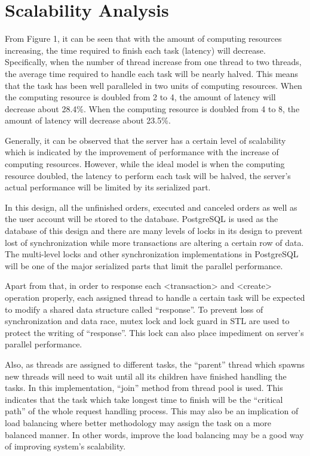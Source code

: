 \documentclass{article}
\begin{document}
\section{Scalability Analysis}
From Figure 1, it can be seen that with the amount of computing resources increasing, the time required to finish each task (latency) will decrease. Specifically, when the number of thread increase from one thread to two threads, the average time required to handle each task will be nearly halved. This means that the task has been well paralleled in two units of computing resources. When the computing resource is doubled from 2 to 4, the amount of latency will decrease about 28.4\%. When the computing resource is doubled from 4 to 8, the amount of latency will decrease about 23.5\%.\vspace{\baselineskip}

Generally, it can be observed that the server has a certain level of scalability which is indicated by the improvement of performance with the increase of computing resources. However, while the ideal model is when the computing resource doubled, the latency to perform each task will be halved, the server’s actual performance will be limited by its serialized part.\vspace{\baselineskip}

In this design, all the unfinished orders, executed and canceled orders as well as the user account will be stored to the database. PostgreSQL is used as the database of this design and there are many levels of locks in its design to prevent lost of synchronization while more transactions are altering a certain row of data. The multi-level locks and other synchronization implementations in PostgreSQL will be one of the major serialized parts that limit the parallel performance.\vspace{\baselineskip}

Apart from that, in order to response each <transaction> and <create> operation properly, each assigned thread to handle a certain task will be expected to modify a shared data structure called “response”. To prevent loss of synchronization and data race, mutex lock and lock guard in STL are used to protect the writing of “response”. This lock can also place impediment on server’s parallel performance.\vspace{\baselineskip}

Also, as threads are assigned to different tasks, the “parent” thread which spawns new threads will need to wait until all its children have finished handling the tasks. In this implementation, “join” method from thread pool is used. This indicates that the task which take longest time to finish will be the “critical path” of the whole request handling process. This may also be an implication of load balancing where better methodology may assign the task on a more balanced manner. In other words, improve the load balancing may be a good way of improving system’s scalability.\vspace{\baselineskip}
\end{document}
